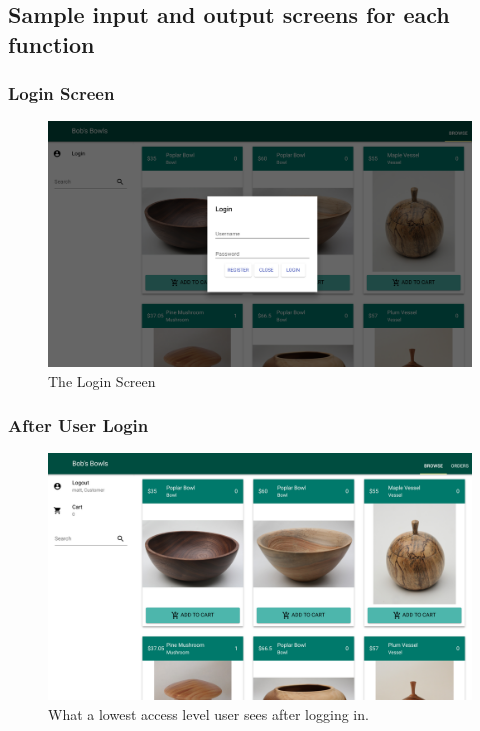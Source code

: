 \documentclass[letterpaper]{article}
\begin{document}
\subsection{Sample input and output screens for each function}

\subsubsection{Login Screen}
\begin{figure}[H]
\centering
\includegraphics[width=.8\textwidth]{login}
\caption{The Login Screen}
\label{cap-login}
\end{figure}


\subsubsection{After User Login}
\begin{figure}[H]
\centering
\includegraphics[width=.8\textwidth]{user-login}
\caption{What a lowest access level user sees after logging in.}
\label{cap-user-login}
\end{figure}
\end{document}
